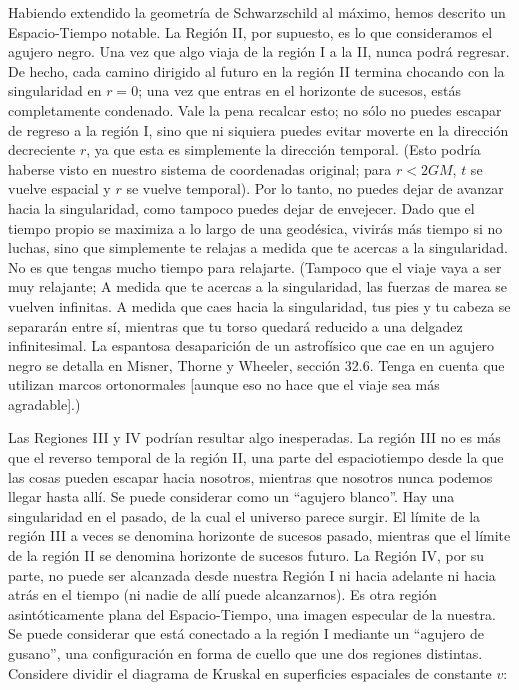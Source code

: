 \documentclass[11pt,b5paper,openany,twoside]{book}
\begin{document}
Habiendo extendido la geometría de Schwarzschild al máximo, hemos descrito un Espacio-Tiempo notable.
La Región II, por supuesto, es lo que consideramos el agujero negro.
Una vez que algo viaja de la región I a la II, nunca podrá regresar.
De hecho, cada camino dirigido al futuro en la región II termina chocando con la singularidad en $r=0$; una vez que entras en el horizonte de sucesos, estás completamente condenado.
Vale la pena recalcar esto; no sólo no puedes escapar de regreso a la región I, sino que ni siquiera puedes evitar moverte en la dirección decreciente $r$, ya que esta es simplemente la dirección temporal.
(Esto podría haberse visto en nuestro sistema de coordenadas original; para $r<2GM$, $t$ se vuelve espacial y $r$ se vuelve temporal).
Por lo tanto, no puedes dejar de avanzar hacia la singularidad, como tampoco puedes dejar de envejecer.
Dado que el tiempo propio se maximiza a lo largo de una geodésica, vivirás más tiempo si no luchas, sino que simplemente te relajas a medida que te acercas a la singularidad.
No es que tengas mucho tiempo para relajarte.
(Tampoco que el viaje vaya a ser muy relajante; A medida que te acercas a la singularidad, las fuerzas de marea se vuelven infinitas.
A medida que caes hacia la singularidad, tus pies y tu cabeza se separarán entre sí, mientras que tu torso quedará reducido a una delgadez infinitesimal.
La espantosa desaparición de un astrofísico que cae en un agujero negro se detalla en Misner, Thorne y Wheeler, sección 32.6.
Tenga en cuenta que utilizan marcos ortonormales [aunque eso no hace que el viaje sea más agradable].)

Las Regiones III y IV podrían resultar algo inesperadas.
La región III no es más que el reverso temporal de la región II, una parte del espaciotiempo desde la que las cosas pueden escapar hacia nosotros, mientras que nosotros nunca podemos llegar hasta allí.
Se puede considerar como un ``agujero blanco''. Hay una singularidad en el pasado, de la cual el universo parece surgir.
El límite de la región III a veces se denomina horizonte de sucesos pasado, mientras que el límite de la región II se denomina horizonte de sucesos futuro.
La Región IV, por su parte, no puede ser alcanzada desde nuestra Región I ni hacia adelante ni hacia atrás en el tiempo (ni nadie de allí puede alcanzarnos).
Es otra región asintóticamente plana del Espacio-Tiempo, una imagen especular de la nuestra.
Se puede considerar que está conectado a la región I mediante un ``agujero de gusano'', una configuración en forma de cuello que une dos regiones distintas.
Considere dividir el diagrama de Kruskal en superficies espaciales de constante $v$:
\end{document}
